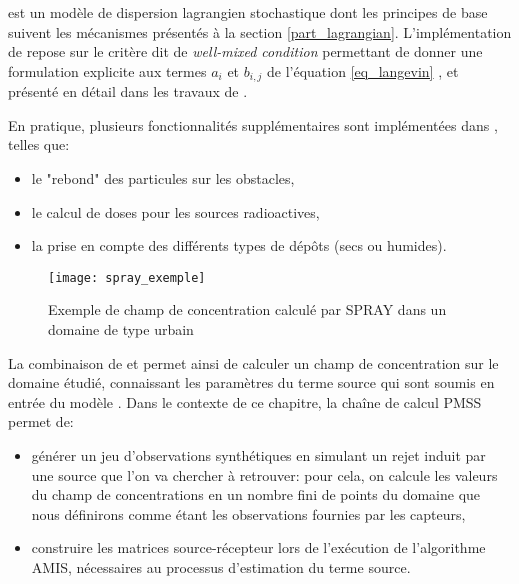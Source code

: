 
 est un modèle de dispersion lagrangien stochastique dont les principes de base suivent les mécanismes présentés à la section \ref{part_lagrangian}. L'implémentation de  repose sur le critère dit de \textit{well-mixed condition} permettant de donner une formulation explicite aux termes $a_i$ et $b_{i,j}$ de l'équation \eqref{eq_langevin} , et présenté en détail dans les travaux de \cite{Thomson1987}.

En pratique, plusieurs fonctionnalités supplémentaires sont implémentées dans , telles que: \\

\begin{itemize}
	\item le "rebond" des particules sur les obstacles,
	\item le calcul de doses pour les sources radioactives,
	\item la prise en compte des différents types de dépôts (secs ou humides).\\
\end{itemize}


\begin{figure}[h!]
	\centering
	\texttt{[image: spray\_exemple]}
	\caption{Exemple de champ de concentration calculé par SPRAY dans un domaine de type urbain}
	\label{fig_spray_exemple}
\end{figure}

La combinaison de  et  permet ainsi de calculer un champ de concentration sur le domaine étudié, connaissant les paramètres du terme source qui sont soumis en entrée du modèle . Dans le contexte de ce chapitre, la chaîne de calcul PMSS permet de:

\begin{itemize}
	\item générer un jeu d'observations synthétiques en simulant un rejet induit par une source que l'on va chercher à retrouver: pour cela, on calcule les valeurs du champ de concentrations en un nombre fini de points du domaine que nous définirons comme étant les observations fournies par les capteurs,
	\item construire les matrices source-récepteur lors de l'exécution de l'algorithme AMIS, nécessaires au processus d'estimation du terme source.\\
\end{itemize}

